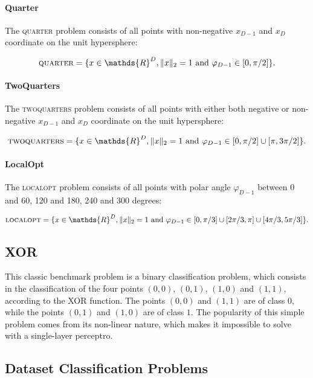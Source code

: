 \paragraph{Quarter}
The \textsc{quarter} problem consists of all points with non-negative $x_{D-1}$ and $x_D$ coordinate on the unit hypersphere:

\[
    \textsc{quarter} = \{x \in \mathds{R}^D, \lVert x \rVert_2 = 1 \text{ and } \varphi_{D-1} \in [0, \pi / 2]\}.
\]

\paragraph{TwoQuarters}
The \textsc{twoquarters} problem consists of all points with either both negative or non-negative $x_{D-1}$ and $x_D$ coordinate on the unit hypersphere:

\[
    \textsc{twoquarters} = \{x \in \mathds{R}^D, \lVert x \rVert_2 = 1 \text{ and } \varphi_{D-1} \in [0, \pi / 2] \cup [\pi, 3\pi / 2]\}.
\]

\paragraph{LocalOpt}
The \textsc{localopt} problem consists of all points with polar angle $\varphi_{D-1}$ between 0 and 60, 120 and 180, 240 and 300 degrees:

\[
    \textsc{localopt} = \{x \in \mathds{R}^D, \lVert x \rVert_2 = 1 \text{ and } \varphi_{D-1} \in [0, \pi / 3] \cup [2\pi / 3, \pi] \cup [4\pi / 3, 5\pi / 3]\}.
\]


\subsection{XOR}

This classic benchmark problem is a binary classification problem, which consists in the classification of the four points $(0, 0)$, $(0, 1)$, $(1, 0)$ and $(1, 1)$, according to the XOR function.
The points $(0, 0)$ and $(1, 1)$ are of class $0$, while the points $(0, 1)$ and $(1, 0)$ are of class $1$.
The popularity of this simple problem comes from its non-linear nature, which makes it impossible to solve with a single-layer perceptro.

\subsection{Dataset Classification Problems}

